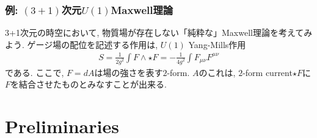 \documentclass{ltjsarticle}
\theoremstyle{mystyle} %
\numberwithin{equation}{section}
\begin{document}
\subsubsection{例: $(3+1)$次元$U(1)$Maxwell理論}
3+1次元の時空において, 物質場が存在しない「純粋な」Maxwell理論を考えてみよう. 
ゲージ場の配位を記述する作用は, $U(1)$ Yang-Mills作用
\begin{align}
    S = \frac{1}{2g^2} \int F\wedge \star F = -\frac{1}{4g^2}\int F_{\mu\nu}F^{\mu\nu}
\end{align}
である. ここで, $F=dA$は場の強さを表す$2$-form. 
$A$のこれは, $2$-form current$\star F$に$F$を結合させたものとみなすことが出来る. 
\newpage
\section{Preliminaries}

\begin{thebibliography}{99}
\end{thebibliography}
\end{document}

